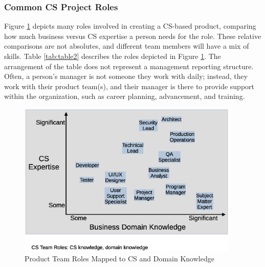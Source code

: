 \subsubsection{Common CS Project Roles}
Figure \ref{fig:figure2} depicts many roles involved in creating a CS-based product, comparing how much business versus CS expertise a person needs for the role. These relative comparisons are not absolutes, and different team members will have a mix of skills. Table \ref{tab:table2} describes the roles depicted in Figure \ref{fig:figure2}. The arrangement of the table does not represent a management reporting structure. Often, a person's manager is not someone they work with daily; instead, they work with their product team(s), and their manager is there to provide support within the organization, such as career planning, advancement, and training. 

\begin{figure}[H]
	\begin{center}
		\caption{Product Team Roles Mapped to CS and Domain Knowledge}
		\label{fig:figure2}
		\vskip 4pt
		\includegraphics[height=2.9in]{figs2/cs-team-roles-knowledge-area.eps}
	\end{center}
\end{figure}




